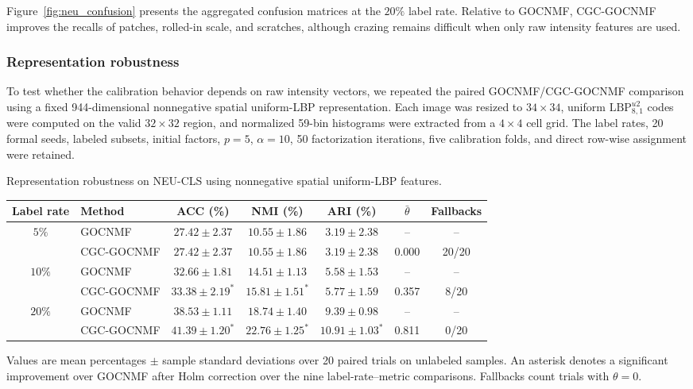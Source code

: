 \documentclass[11pt]{article}
\newenvironment{widetable}
  {\begin{strip}\centering\captionsetup{type=table}}
  {\end{strip}}
\theoremstyle{remark}
\begin{document}
Figure~\ref{fig:neu_confusion} presents the aggregated confusion matrices at the $20\%$ label rate. Relative to GOCNMF, CGC-GOCNMF improves the recalls of patches, rolled-in scale, and scratches, although crazing remains difficult when only raw intensity features are used.

\subsubsection{Representation robustness}
To test whether the calibration behavior depends on raw intensity vectors, we repeated the paired GOCNMF/CGC-GOCNMF comparison using a fixed 944-dimensional nonnegative spatial uniform-LBP representation. Each image was resized to $34\times34$, uniform $\mathrm{LBP}_{8,1}^{u2}$ codes were computed on the valid $32\times32$ region, and normalized 59-bin histograms were extracted from a $4\times4$ cell grid. The label rates, 20 formal seeds, labeled subsets, initial factors, $p=5$, $\alpha=10$, 50 factorization iterations, five calibration folds, and direct row-wise assignment were retained.

\begin{widetable}
\centering
\caption{Representation robustness on NEU-CLS using nonnegative spatial uniform-LBP features.}
\label{tab:neu_lbp}
\small
\setlength{\tabcolsep}{11.8pt}
\begin{tabular}{clccccc}
\toprule
Label rate & Method & ACC (\%) & NMI (\%) & ARI (\%) & $\bar{\theta}$ & Fallbacks \\
\midrule
\multirow{2}{*}{$5\%$}
& GOCNMF & $27.42\pm2.37$ & $10.55\pm1.86$ & $3.19\pm2.38$ & -- & -- \\
& CGC-GOCNMF & $27.42\pm2.37$ & $10.55\pm1.86$ & $3.19\pm2.38$ & 0.000 & 20/20 \\
\midrule
\multirow{2}{*}{$10\%$}
& GOCNMF & $32.66\pm1.81$ & $14.51\pm1.13$ & $5.58\pm1.53$ & -- & -- \\
& CGC-GOCNMF & $\mathbf{33.38\pm2.19}^{*}$ & $\mathbf{15.81\pm1.51}^{*}$ & $5.77\pm1.59$ & 0.357 & 8/20 \\
\midrule
\multirow{2}{*}{$20\%$}
& GOCNMF & $38.53\pm1.11$ & $18.74\pm1.40$ & $9.39\pm0.98$ & -- & -- \\
& CGC-GOCNMF & $\mathbf{41.39\pm1.20}^{*}$ & $\mathbf{22.76\pm1.25}^{*}$ & $\mathbf{10.91\pm1.03}^{*}$ & 0.811 & 0/20 \\
\bottomrule
\end{tabular}%

\vspace{1mm}
\parbox{0.98\linewidth}{\footnotesize Values are mean percentages $\pm$ sample standard deviations over 20 paired trials on unlabeled samples. An asterisk denotes a significant improvement over GOCNMF after Holm correction over the nine label-rate--metric comparisons. Fallbacks count trials with $\theta=0$.}
\end{widetable}
\end{document}
